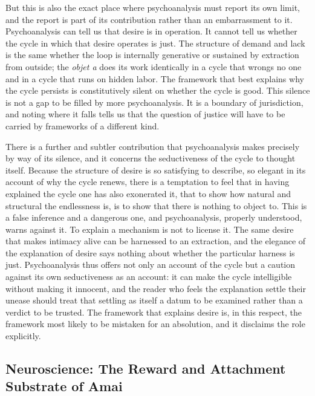 But this is also the exact place where psychoanalysis must report its own limit, and the report is part of its contribution rather than an embarrassment to it. Psychoanalysis can tell us that desire is in operation. It cannot tell us whether the cycle in which that desire operates is just. The structure of demand and lack is the same whether the loop is internally generative or sustained by extraction from outside; the \textit{objet a} does its work identically in a cycle that wrongs no one and in a cycle that runs on hidden labor. The framework that best explains why the cycle persists is constitutively silent on whether the cycle is good. This silence is not a gap to be filled by more psychoanalysis. It is a boundary of jurisdiction, and noting where it falls tells us that the question of justice will have to be carried by frameworks of a different kind.

There is a further and subtler contribution that psychoanalysis makes precisely by way of its silence, and it concerns the seductiveness of the cycle to thought itself. Because the structure of desire is so satisfying to describe, so elegant in its account of why the cycle renews, there is a temptation to feel that in having explained the cycle one has also exonerated it, that to show how natural and structural the endlessness is, is to show that there is nothing to object to. This is a false inference and a dangerous one, and psychoanalysis, properly understood, warns against it. To explain a mechanism is not to license it. The same desire that makes intimacy alive can be harnessed to an extraction, and the elegance of the explanation of desire says nothing about whether the particular harness is just. Psychoanalysis thus offers not only an account of the cycle but a caution against its own seductiveness as an account: it can make the cycle intelligible without making it innocent, and the reader who feels the explanation settle their unease should treat that settling as itself a datum to be examined rather than a verdict to be trusted. The framework that explains desire is, in this respect, the framework most likely to be mistaken for an absolution, and it disclaims the role explicitly.

\subsection{Neuroscience: The Reward and Attachment Substrate of Amai}

